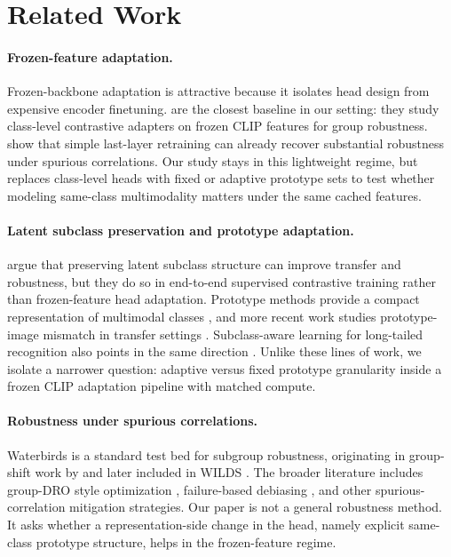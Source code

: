 \documentclass[10pt,twocolumn]{article}
\begin{document}
\section{Related Work}
\label{sec:related}
\paragraph{Frozen-feature adaptation.}
Frozen-backbone adaptation is attractive because it isolates head design from expensive encoder finetuning. \citet{zhang2022Contrastive} are the closest baseline in our setting: they study class-level contrastive adapters on frozen CLIP features for group robustness. \citet{kirichenko2022last} show that simple last-layer retraining can already recover substantial robustness under spurious correlations. Our study stays in this lightweight regime, but replaces class-level heads with fixed or adaptive prototype sets to test whether modeling same-class multimodality matters under the same cached features.

\paragraph{Latent subclass preservation and prototype adaptation.}
\citet{chen2022Perfectly} argue that preserving latent subclass structure can improve transfer and robustness, but they do so in end-to-end supervised contrastive training rather than frozen-feature head adaptation. Prototype methods provide a compact representation of multimodal classes \citep{snell2017Prototypical,mettes2019Hyperspherical}, and more recent work studies prototype-image mismatch in transfer settings \citep{tian2024Mind}. Subclass-aware learning for long-tailed recognition also points in the same direction \citep{hou2023Subclass}. Unlike these lines of work, we isolate a narrower question: adaptive versus fixed prototype granularity inside a frozen CLIP adaptation pipeline with matched compute.

\paragraph{Robustness under spurious correlations.}
Waterbirds is a standard test bed for subgroup robustness, originating in group-shift work by \citet{sagawa2020distributionally} and later included in WILDS \citep{koh2021wilds}. The broader literature includes group-DRO style optimization \citep{sagawa2020distributionally}, failure-based debiasing \citep{nam2020learning}, and other spurious-correlation mitigation strategies. Our paper is not a general robustness method. It asks whether a representation-side change in the head, namely explicit same-class prototype structure, helps in the frozen-feature regime.
\end{document}
